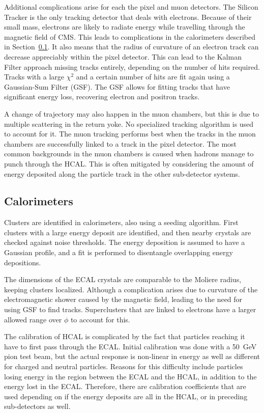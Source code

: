 Additional complications arise for each the pixel and muon detectors.
The Silicon Tracker is the only tracking detector that deals with electrons.
Because of their small mass, electrons are likely to radiate energy
while travelling through the magnetic field of CMS.
This leads to complications in the calorimeters described in Section~\ref{sec:calorimeters}.
It also means that the radius of curvature of an electron track can decrease appreciably
within the pixel detector.
This can lead to the Kalman Filter approach missing tracks entirely,
depending on the number of hits required.
Tracks with a large $\chi^2$ and a certain number of hits are fit again
using a Gaussian-Sum Filter (GSF).
The GSF allows for fitting tracks that have significant energy loss,
recovering electron and positron tracks.

A change of trajectory may also happen in the muon chambers,
but this is due to multiple scattering in the return yoke.
No specialized tracking algorithm is used to account for it.
The muon tracking performs best when the tracks in the muon chambers are successfully
linked to a track in the pixel detector.
The most common backgrounds in the muon chambers
is caused when hadrons manage to punch through the HCAL.
This is often mitigated by considering the amount of energy deposited along the particle
track in the other sub-detector systems.

\subsection{Calorimeters} \label{sec:calorimeters}

Clusters are identified in calorimeters, also using a seeding algorithm.
First clusters with a large energy deposit are identified,
and then nearby crystals are checked against noise thresholds.
The energy deposition is assumed to have a Gaussian profile,
and a fit is performed to disentangle overlapping energy depositions.

The dimensions of the ECAL crystals
are comparable to the Moliere radius, keeping clusters localized.
Although a complication arises due to curvature of the electromagnetic shower
caused by the magnetic field, leading to the need for using GSF to find tracks.
Superclusters that are linked to electrons have
a larger allowed range over $\phi$ to account for this.

The calibration of HCAL is complicated by the fact that particles reaching it
have to first pass through the ECAL.
Initial calibration was done with a \SI{50}{GeV} pion test beam,
but the actual response is non-linear in energy
as well as different for charged and neutral particles.
Reasons for this difficulty include particles losing energy in the region
between the ECAL and the HCAL, in addition to the energy lost in the ECAL.
Therefore, there are calibration coefficients that are used
depending on if the energy deposits are all in the HCAL,
or in preceding sub-detectors as well.

